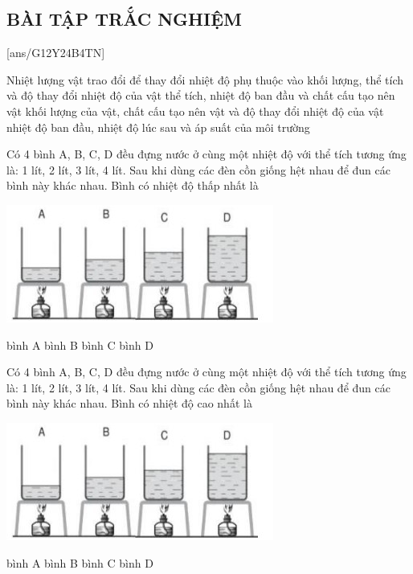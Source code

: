 \subsection{BÀI TẬP TRẮC NGHIỆM}
\setcounter{ex}{0}
[ans/G12Y24B4TN]
\begin{ex}
	Nhiệt lượng vật trao đổi để thay đổi nhiệt độ phụ thuộc vào
	\choice
	{khối lượng, thể tích và độ thay đổi nhiệt độ của vật}
	{ thể tích, nhiệt độ ban đầu và chất cấu tạo nên vật}
	{\True  khối lượng của vật, chất cấu tạo nên vật và độ thay đổi nhiệt độ của vật}
	{nhiệt độ ban đầu, nhiệt độ lúc sau và áp suất của môi trường}
	\loigiai{ }
	\end{ex}
\begin{ex}
	Có 4 bình A, B, C, D đều đựng nước ở cùng một nhiệt độ với thể tích tương ứng là: 1 lít, 2 lít, 3 lít, 4 lít. Sau
	khi dùng các đèn cồn giống hệt nhau để đun các bình này khác nhau. Bình có nhiệt độ thấp nhất là
	\begin{center}
		\includegraphics[width=0.4\linewidth]{figs/VN12-Y24-PH-SYL-004P-1}
	\end{center}
	\choice
	{bình A}
	{bình B}
	{bình C}
	{\True bình D}
	\loigiai{}
\end{ex}
\begin{ex}
Có 4 bình A, B, C, D đều đựng nước ở cùng một nhiệt độ với thể tích tương ứng là: 1 lít, 2 lít, 3 lít, 4 lít. Sau
khi dùng các đèn cồn giống hệt nhau để đun các bình này khác nhau. Bình có nhiệt độ cao nhất là
\begin{center}
	\includegraphics[width=0.4\linewidth]{figs/VN12-Y24-PH-SYL-004P-1}
\end{center}
	\choice
	{\True bình A}
	{bình B}
	{bình C}
	{bình D}
	\loigiai{}
\end{ex}
